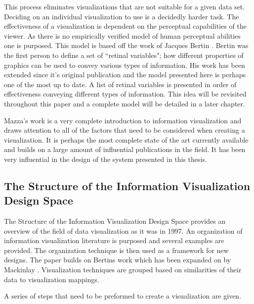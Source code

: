 \documentclass[a4paper, 11pt, titlepage, onehalfspacing]{report}
\begin{document}
This process eliminates visualizations that are not suitable for a given data set. Deciding on an individual visualization to use is a decidedly harder task. The effectiveness of a visualization is dependent on the perceptual capabilities of the viewer. As there is no empirically verified model of human perceptual abilities one is purposed. This model is based off the work of Jacques Bertin \cite{bertin1973semiologie}. Bertin was the first person to define a set of ``retinal variables"; how different properties of graphics can be used to convey various types of information. His work has been extended since it's original publication and the model presented here is perhaps one of the most up to date. A list of retinal variables is presented in order of effectiveness conveying different types of information. This idea will be revisited throughout this paper and a complete model will be detailed in a later chapter. 

Mazza's work is a very complete introduction to information visualization and draws attention to all of the factors that need to be considered when creating a visualization. It is perhaps the most complete state of the art currently available and builds on a large amount of influential publications in the field. It has been very influential in the design of the system presented in this thesis.


		\subsection{The Structure of the Information Visualization Design Space}

The Structure of the Information Visualization Design Space provides an overview of the field of data visualization as it was in 1997. An organization of information visualization literature is purposed and several examples are provided. The organization technique is then used as a framework for new designs. The paper builds on Bertins work \cite{bertin1973semiologie} which has been expanded on by Mackinlay \cite{mackinlay1986automating}. Visualization techniques are grouped based on similarities of their data to visualization mappings.

A series of steps that need to be preformed to create a visualization are given. 
\end{document}
